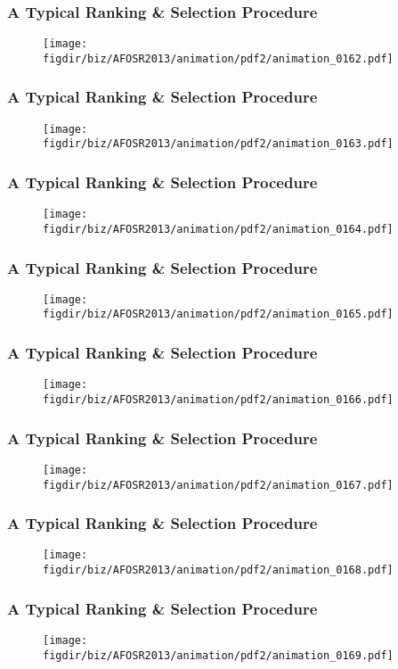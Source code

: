 \documentclass[13pt]{beamer}
\newcommand{\figdir}{../../fig}
\begin{document}
\begin{frame}\frametitle{A Typical Ranking \& Selection Procedure}\begin{figure}\texttt{[image: \\figdir/biz/AFOSR2013/animation/pdf2/animation\_0162.pdf]}\end{figure}\end{frame}
\begin{frame}\frametitle{A Typical Ranking \& Selection Procedure}\begin{figure}\texttt{[image: \\figdir/biz/AFOSR2013/animation/pdf2/animation\_0163.pdf]}\end{figure}\end{frame}
\begin{frame}\frametitle{A Typical Ranking \& Selection Procedure}\begin{figure}\texttt{[image: \\figdir/biz/AFOSR2013/animation/pdf2/animation\_0164.pdf]}\end{figure}\end{frame}
\begin{frame}\frametitle{A Typical Ranking \& Selection Procedure}\begin{figure}\texttt{[image: \\figdir/biz/AFOSR2013/animation/pdf2/animation\_0165.pdf]}\end{figure}\end{frame}
\begin{frame}\frametitle{A Typical Ranking \& Selection Procedure}\begin{figure}\texttt{[image: \\figdir/biz/AFOSR2013/animation/pdf2/animation\_0166.pdf]}\end{figure}\end{frame}
\begin{frame}\frametitle{A Typical Ranking \& Selection Procedure}\begin{figure}\texttt{[image: \\figdir/biz/AFOSR2013/animation/pdf2/animation\_0167.pdf]}\end{figure}\end{frame}
\begin{frame}\frametitle{A Typical Ranking \& Selection Procedure}\begin{figure}\texttt{[image: \\figdir/biz/AFOSR2013/animation/pdf2/animation\_0168.pdf]}\end{figure}\end{frame}
\begin{frame}\frametitle{A Typical Ranking \& Selection Procedure}\begin{figure}\texttt{[image: \\figdir/biz/AFOSR2013/animation/pdf2/animation\_0169.pdf]}\end{figure}\end{frame}
\end{document}
